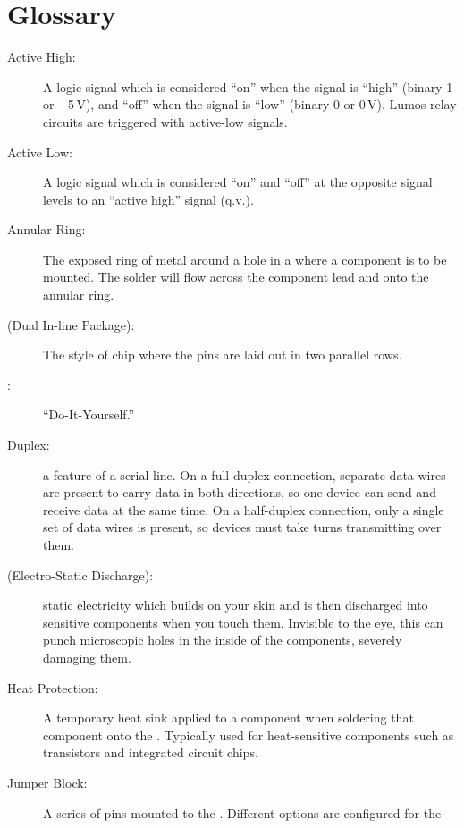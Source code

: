 \documentclass[letterpaper,twoside,onecolumn,openright,final]{memoir}
\begin{document}
\chapter{Glossary}\label{ch:glossary}
\begin{description}
	\item[Active High:]
		A logic signal which is considered ``on'' when the signal is ``high'' (binary 1 or +5\,V),
		and ``off'' when the signal is ``low'' (binary 0 or 0\,V).  Lumos relay circuits are 
		triggered with active-low signals.
	\item[Active Low:]
		A logic signal which is considered ``on'' and ``off'' at the opposite signal levels
		to an ``active high'' signal (q.v.).
	\item[Annular Ring:]
		The exposed ring of metal around a hole in a  where a component is to be 
		mounted.  The solder will flow across the component lead and onto the annular ring.
	\item[ (Dual In-line Package):]
		The style of chip where the pins are laid out in two parallel rows.
	\item[:] ``Do-It-Yourself.''
	\item[Duplex:]
		a feature of a serial line.  On a full-duplex connection, separate data wires are present
		to carry data in both directions, so one device can send and receive data at the same time.
		On a half-duplex connection, only a single set of data wires is present, so devices must
		take turns transmitting over them.
	\item[ (Electro-Static Discharge):]
		static electricity which builds on your skin and is then discharged into sensitive
		components when you touch them.  Invisible to the eye, this can punch microscopic holes
		in the inside of the components, severely damaging them.
	\item[Heat Protection:]
		A temporary heat sink applied to a component when soldering that component onto
		the .  Typically used for heat-sens\-i\-tive components such as transistors
		and integrated circuit chips.
	\item[Jumper Block:]
		A series of pins mounted to the .  Different options are configured for the

\end{description}
\end{document}
